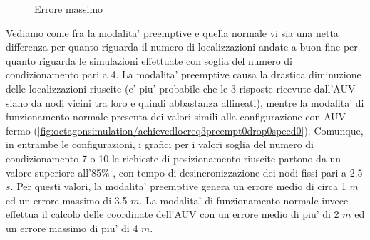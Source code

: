 \begin{figure}[H]
    \centering
    \hfill
    \caption{Errore massimo}
\end{figure}
Vediamo come fra la modalita' preemptive e quella normale vi sia una netta differenza per quanto riguarda il numero di localizzazioni andate a buon fine per quanto riguarda le simulazioni effettuate con soglia del numero di condizionamento pari a 4. La modalita' preemptive causa la drastica diminuzione delle localizzazioni riuscite (e' piu' probabile che le 3 risposte ricevute dall'AUV siano da nodi vicini tra loro e quindi abbastanza allineati), mentre la modalita' di funzionamento normale presenta dei valori simili alla configurazione con AUV fermo (\ref{fig:octagonsimulation/achievedlocreq3preempt0drop0speed0}).
Comunque, in entrambe le configurazioni, i grafici per i valori soglia del numero di condizionamento 7 o 10 le richieste di posizionamento riuscite partono da un valore superiore all'85\% , con tempo di desincronizzazione dei nodi fissi pari a 2.5 $s$.
Per questi valori, la modalita' preemptive genera un errore medio di circa 1 $m$ ed un errore massimo di 3.5 $m$. La modalita' di funzionamento normale invece effettua il calcolo delle coordinate dell'AUV con un errore medio di piu' di 2 $m$ ed un errore massimo di piu' di 4 $m$.
